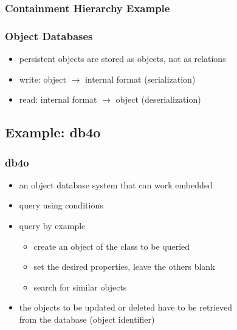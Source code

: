 \documentclass[dvipsnames]{beamer}
\theoremstyle{plain}
\begin{document}
\begin{frame}
  \frametitle{Containment Hierarchy Example}

  \begin{example}
    \begin{center}
    \end{center}
  \end{example}
\end{frame}

\begin{frame}
  \frametitle{Object Databases}

  \begin{itemize}
    \item persistent objects are stored as objects, not as relations

    \medskip
    \item write: object $\rightarrow$ internal format (\alert{serialization})
    \item read: internal format $\rightarrow$ object (\alert{deserialization})
  \end{itemize}
\end{frame}

\subsection{Example: db4o}

\begin{frame}
  \frametitle{db4o}

  \begin{itemize}
    \item an object database system that can work embedded

    \pause
    \medskip
    \item query using conditions
    \item query by example
    \begin{itemize}
      \item create an object of the class to be queried
      \item set the desired properties, leave the others blank
      \item search for similar objects
    \end{itemize}

    \pause
    \medskip
    \item the objects to be updated or deleted have to be retrieved\\
      from the database (object identifier)
  \end{itemize}
\end{frame}
\end{document}
